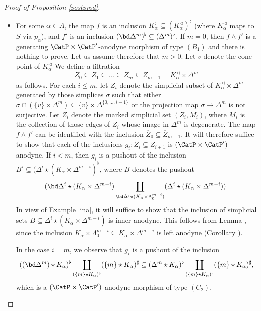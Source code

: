 \begin{proof}[Proof of Proposition \ref{postprod}]
\begin{itemize}
\item[$(B'_1)$] For some $\alpha \in A$, the map $f$ is an inclusion
$K_{\alpha}^{\sharp} \subseteq (K_{\alpha}^{\triangleleft})^{\sharp}$ (where $K_{\alpha}^{\triangleleft}$ maps to $S$ via $p_{\alpha}$), and $f'$ is an inclusion
$(\bd \Delta^m)^{\flat} \subseteq (\Delta^m)^{\flat}$. If $m=0$, then $f \wedge f'$ is a generating $\CatP \times \CatP'$-anodyne morphism of type $(B_1)$ and there is nothing to prove. Let us assume
therefore that $m > 0$. Let $v$ denote the cone point of $K_{\alpha}^{\triangleleft}$
We define a filtration 
$$ Z_0 \subseteq Z_1 \subseteq \ldots \subseteq Z_m \subseteq Z_{m+1} = K_{\alpha}^{\triangleleft} \times \Delta^m$$ as follows. For each $i \leq m$, let $Z_i$ denote the simplicial subset of
$K_{\alpha}^{\triangleleft} \times \Delta^m$ generated by those simplices $\sigma$ such that
either $\sigma \cap ( \{v\} \times \Delta^m) \subseteq \{v \} \times \Delta^{ \{0, \ldots, i-1 \} }$ or
the projection map $\sigma \rightarrow \Delta^m$ is not surjective. Let $\overline{Z}_i$ denote the
marked simplicial set $(Z_i, M_i)$, where $M_i$ is the collection of those edges of $Z_i$ whose
image in $\Delta^m$ is degenerate. The map $f \wedge f'$ can be identified with the inclusion
$\overline{Z}_0 \subseteq \overline{Z}_{m+1}$. It will therefore suffice to show that each of the inclusions $g_i: \overline{Z}_i \subseteq \overline{Z}_{i+1}$ is $(\CatP \times \CatP')$-anodyne. If $i < m$, then
$g_i$ is a pushout of the inclusion $B^{\flat} \subseteq ( \Delta^{i} \star (K_{\alpha} \times \Delta^{m-i} )^{\flat}$, where $B$ denotes the pushout 
$$(\bd \Delta^i \star (K_{\alpha} \times \Delta^{m-i })
\coprod_{ \bd \Delta^i \star (K_{\alpha} \times \Lambda^{m-i}_0)}
( \Delta^i \star (K_{\alpha} \times \Delta^{m-i} ) ).$$
In view of Example \ref{ina}, it will suffice to show that the inclusion of simplicial sets
$B \subseteq \Delta^i \star (K_{\alpha} \times \Delta^{m-i})$ is inner anodyne. This follows from
Lemma , since the inclusion $K_{\alpha} \times \Lambda^{m-i}_0
\subseteq K_{\alpha} \times \Delta^{m-i}$ is left anodyne (Corollary ).

In the case $i=m$, we observe that $g_i$ is a pushout of the inclusion
$$ ((\bd \Delta^m) \star K_{\alpha})^{\flat}
\coprod_{ (\{m\} \star K_{\alpha})^{\flat} }
( \{m\} \star K_{\alpha} )^{\sharp} 
\subseteq ( \Delta^m \star K_{\alpha})^{\flat} \coprod_{ (\{m\} \star K_{\alpha})^{\flat} }
( \{m\} \star K_{\alpha} )^{\sharp},$$
which is a $(\CatP \times \CatP')$-anodyne morphism of type $(C_2)$.


\end{itemize}
\end{proof}
